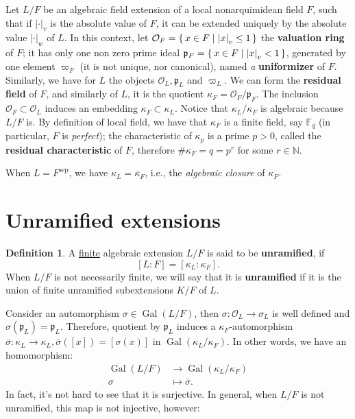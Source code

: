 \documentclass[12pt]{article}
\theoremstyle{plain}
\theoremstyle{definition}
\newtheorem{definition}[theorem]{Definition}
\newenvironment{Definition}{\colorlet{shadecolor}{Apricot!12} \begin{shaded} \begin{definition} }{ \end{definition} \end{shaded} }
\newcommand{\naturals}{\mathbb{N}}
\newcommand{\abs}[1]{\left \vert #1 \right \vert}
\renewcommand{\bar}[1]{\overline{#1}}
\newcommand{\Gal}[2]{\operatorname{Gal} ( #1 / #2 )}
\newcommand{\primo}[1]{\mathfrak{#1}}
\renewcommand{\O}{\mathcal{O}}
\newcommand{\sep}[1]{{#1}^{\operatorname{sep}}}
\begin{document}
Let $L/F$ be an algebraic field extension of a local nonarquimidean field $F$, such that if $\abs \cdot _v$ is the absolute value of $F$, it can be extended uniquely by the absolute value $\abs \cdot _w$ of $L$. In this context, let $\O_F = \set{x \in F | \abs x _v \leq 1}$ the \textbf{valuation ring} of $F$; it has only one non zero prime ideal $\primo p_{F} = \set{x \in F | \abs x _v < 1}$, generated by one element $\varpi_F$ (it is not unique, nor canonical), named \textit{a} \textbf{uniformizer} of $F$. Similarly, we have for $L$ the objects $\O_L, \primo p_L$ and $\varpi_L$. We can form the \textbf{residual field} of $F$, and similarly of $L$, it is the quotient $\kappa_F = \O_F / \primo p_F$. The inclusion $\O_F \subset \O_L$ induces an embedding $\kappa_F \subset \kappa_L$. Notice that $\kappa_L / \kappa_F$ is algebraic because $L/F$ is. By definition of local field, we have that $\kappa_F$ is a finite field, say $\mathbb{F}_q$ (in particular, $F$ is \textit{perfect}); the characteristic of $\kappa_p$ is a prime $p> 0$, called the \textbf{residual characteristic} of $F$, therefore $\# \kappa_F = q = p^r$ for some $r \in \naturals$.

When $L = \sep {F}$, we have $\kappa_L = \bar \kappa_F$, i.e., the \textit{algebraic closure} of $\kappa_F$.


\section{Unramified extensions}

\begin{Definition}
A \underline{finite} algebraic extension $L/F$ is said to be \textbf{unramified}, if
\[
    [L : F] = [\kappa_L : \kappa_F].
\]
When $L/F$ is not necessarily finite, we will say that it is \textbf{unramified} if it is the union of finite unramified subextensions $K/F$ of $L$.
\end{Definition}

Consider an automorphism $\sigma \in \Gal {L} F$, then $\sigma : \O_L \to \sigma_ L$ is well defined and $\sigma (\primo p _L) = \primo p _L$. Therefore, quotient by $\primo p _L$ induces a $\kappa_F$-automorphism $\bar \sigma : \kappa_L \to \kappa_L, \bar \sigma ([x]) = [\sigma (x)]$ in $\Gal {\kappa_L} {\kappa_F}$. In other words, we have an homomorphism:
\begin{align*}
\Gal L F &\longrightarrow \Gal {\kappa_L} {\kappa_F} \\
\sigma &\longmapsto \bar \sigma.
\end{align*}
In fact, it's not hard to see that it is surjective. In general, when $L/F$ is not unramified, this map is not injective, however:
\end{document}
